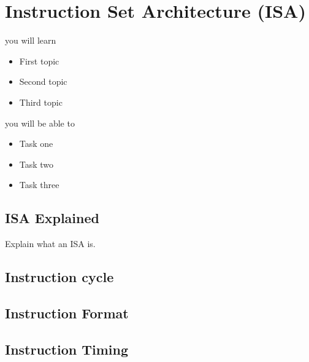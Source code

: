 \setchapterpreamble[u]{\margintoc}
\chapter{Instruction Set Architecture (ISA)}

%
\begin{kaobox}[frametitle=In This Chapter]
you will learn
\begin{itemize}
	\item First topic
	\item Second topic
        \item Third topic
\end{itemize}

you will be able to
\begin{itemize}
        \item Task one
        \item Task two
        \item Task three
\end{itemize}
\end{kaobox}

\blindtext

%
\section{ISA Explained}
Explain what an ISA is.

%
\section{Instruction cycle}
\blindtext

%
\section{Instruction Format}
\blindtext

%
\section{Instruction Timing}
\blindtext

